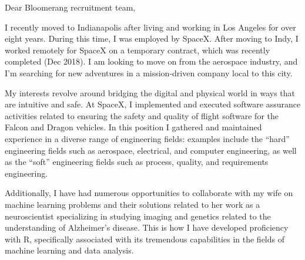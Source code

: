 \begin{cvletter}


Dear Bloomerang recruitment team,

I recently moved to Indianapolis after living and working in Los Angeles for over eight
years. During this time, I was employed by SpaceX. After moving to Indy, I worked remotely for
SpaceX on a temporary contract, which was recently completed (Dec 2018). I am looking to move on
from the aerospace industry, and I'm searching for new adventures in a mission-driven company local
to this city.

My interests revolve around bridging the digital and physical world in ways that are intuitive and
safe. At SpaceX, I implemented and executed software assurance activities related to ensuring the
safety and quality of flight software for the Falcon and Dragon vehicles. In this position I
gathered and maintained experience in a diverse range of engineering fields: examples include the
``hard'' engineering fields such as aerospace, electrical, and computer engineering, as well as the
``soft'' engineering fields such as process, quality, and requirements engineering.

Additionally, I have had numerous opportunities to collaborate with my wife on machine learning
problems and their solutions related to her work as a neuroscientist specializing in studying
imaging and genetics related to the understanding of Alzheimer's disease. This is how I have
developed proficiency with R, specifically associated with its tremendous capabilities in the fields
of machine learning and data analysis.







\end{cvletter}
